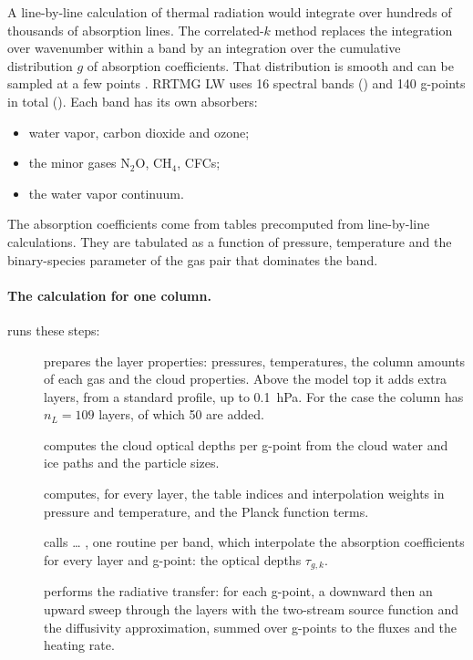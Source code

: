 A line-by-line calculation of thermal radiation would integrate over hundreds of thousands of absorption lines. The
correlated-$k$ method replaces the integration over wavenumber within a band by an integration over the cumulative
distribution $g$ of absorption coefficients. That distribution is smooth and can be sampled at a few points
\citep{mlawer1997}. RRTMG LW uses 16 spectral bands () and 140 g-points in total (). Each
band has its own absorbers:
\begin{itemize}
  \item water vapor, carbon dioxide and ozone;
  \item the minor gases N$_2$O, CH$_4$, CFCs;
  \item the water vapor continuum.
\end{itemize}
The absorption coefficients come from tables precomputed from line-by-line calculations. They are tabulated as a
function of pressure, temperature and the binary-species parameter of the gas pair that dominates the band.

\paragraph{The calculation for one column.}  runs these steps:
\begin{description}
  \item[] prepares the layer properties: pressures, temperatures, the column amounts of each gas and the
    cloud properties. Above the model top it adds extra layers, from a standard profile, up to 0.1~hPa. For the case
    the column has $n_L = 109$ layers, of which 50 are added.
  \item[] computes the cloud optical depths per g-point from the cloud water and ice paths and the
    particle sizes.
  \item[] computes, for every layer, the table indices and interpolation weights in pressure and
    temperature, and the Planck function terms.
  \item[] calls  \dots{} , one routine per band, which interpolate the
    absorption coefficients for every layer and g-point: the optical depths $\tau_{g,k}$.
  \item[] performs the radiative transfer: for each g-point, a downward then an upward sweep through the
    layers with the two-stream source function and the diffusivity approximation, summed over g-points to the fluxes
    and the heating rate.
\end{description}

